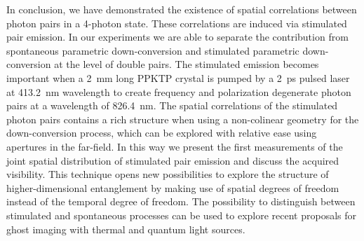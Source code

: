 In conclusion, we have demonstrated the existence of spatial correlations between photon pairs in a 4-photon state. These correlations are induced via stimulated pair emission. In our experiments we are able to separate the contribution from spontaneous parametric down-conversion and stimulated parametric down-conversion at the level of double pairs. The stimulated emission becomes important when a 2~mm long PPKTP crystal is pumped by a 2~ps pulsed laser at 413.2~nm wavelength to create frequency and polarization degenerate photon pairs at a wavelength of 826.4~nm. The spatial correlations of the stimulated photon pairs contains a rich structure when using a non-colinear geometry for the down-conversion process, which can be explored with relative ease using apertures in the far-field. In this way we present the first measurements of the joint spatial distribution of stimulated pair emission and discuss the acquired visibility. This technique opens new possibilities to explore the structure of higher-dimensional entanglement by making use of spatial degrees of freedom instead of the temporal degree of freedom. The possibility to distinguish between stimulated and spontaneous processes can be used to explore recent proposals for ghost imaging with thermal and quantum light sources\cite{Chan:PRA2009,Osullivan:PRA2010}.

